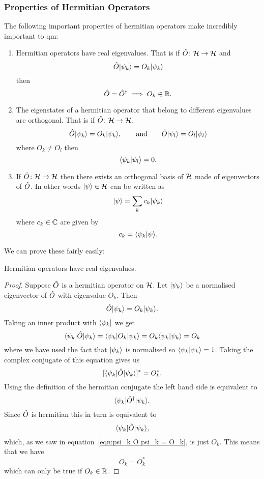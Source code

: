     \subsubsection{Properties of Hermitian Operators}
    The following important properties of hermitian operators make incredibly important to \acrshort{qm}:
    \begin{enumerate}
        \item Hermitian operators have real eigenvalues.
        That is if \(\hat{O}\colon\mathcal{H}\to\mathcal{H}\) and
        \[\hat{O}\vert {\psi_k} \rangle = O_k\vert {\psi_k} \rangle\]
        then
        \[\hat{O} = \hat{O}^\dagger \implies O_k\in\mathbb{R}.\]
        
        \item The eigenstates of a hermitian operator that belong to different eigenvalues are orthogonal.
        That is if \(\hat{O}\colon\mathcal{H}\to\mathcal{H}\),
        \[\hat{O}\vert {\psi_k} \rangle = O_k\vert {\psi_k} \rangle, \qquad\text{and}\qquad \hat{O}\vert {\psi_l} \rangle = O_l\vert {\psi_l} \rangle\]
        where \(O_k \ne O_l\) then
        \[\langle {\psi_k} \vert {\psi_l} \rangle = 0.\]
        
        \item If \(\hat{O}\colon\mathcal{H}\to\mathcal{H}\) then there exists an orthogonal basis of \(\mathcal{H}\) made of eigenvectors of \(\hat{O}\).
        In other words \(\vert {\psi} \rangle\in\mathcal{H}\) can be written as
        \[\vert {\psi} \rangle = \sum_k c_k\vert {\psi_k} \rangle\]
        where \(c_k\in\mathbb{C}\) are given by
        \[c_k = \langle {\psi_k} \vert {\psi} \rangle.\]
    \end{enumerate}
    We can prove these fairly easily:
    \begin{theorem}
        Hermitian operators have real eigenvalues.
    \end{theorem}
    \begin{proof}
        Suppose \(\hat{O}\) is a hermitian operator on \(\mathcal{H}\).
        Let \(\vert {\psi_k} \rangle\) be a normalised eigenvector of \(\hat{O}\) with eigenvalue \(O_k\).
        Then
        \[\hat{O}\vert {\psi_k} \rangle = O_k\vert {\psi_k} \rangle.\]
        Taking an inner product with \(\langle {\psi_k} \vert\) we get
        \begin{equation}\label{eqn:psi_k O psi_k = O_k}
            \langle {\psi_k} \vert\hat{O}\vert {\psi_k} \rangle = \langle {\psi_k} \vert O_k\vert {\psi_k} \rangle = O_k\langle {\psi_k} \vert {\psi_k} \rangle = O_k
        \end{equation}
        where we have used the fact that \(\vert {\psi_k} \rangle\) is normalised so \(\langle {\psi_k} \vert {\psi_k} \rangle = 1\).
        Taking the complex conjugate of this equation gives us
        \[[\langle {\psi_k} \vert\hat{O}\vert {\psi_k} \rangle]^* = O_k^*.\]
        Using the definition of the hermitian conjugate the left hand side is equivalent to
        \[\langle {\psi_k} \vert\hat{O}^\dagger\vert {\psi_k} \rangle.\]
        Since \(\hat{O}\) is hermitian this in turn is equivalent to
        \[\langle {\psi_k} \vert\hat{O}\vert {\psi_k} \rangle,\]
        which, as we saw in equation~\ref{eqn:psi_k O psi_k = O_k}, is just \(O_k\).
        This means that we have
        \[O_k = O_k^*\]
        which can only be true if \(O_k\in\mathbb{R}\).
    \end{proof}
